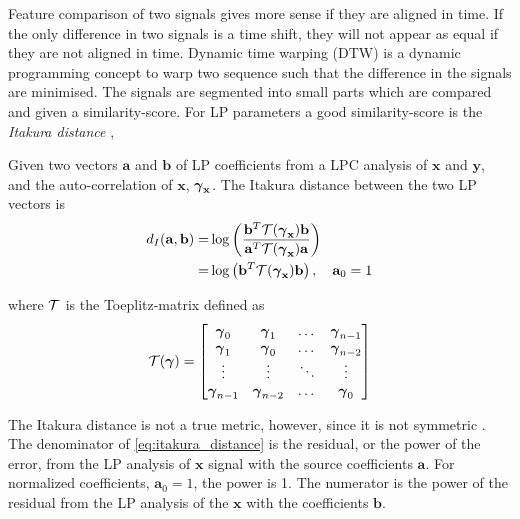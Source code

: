 Feature comparison of two signals gives more sense if they are aligned in time. If the only difference in two signals is a time shift, they will not appear as equal if they are not aligned in time. Dynamic time warping (DTW) is a dynamic programming concept to warp two sequence such that the difference in the signals are minimised. The signals are segmented into small parts which are compared and given a similarity-score. For LP parameters a good similarity-score is the \emph{Itakura distance} \cite{itakura90},
\newcommand{\ita}{d_{I}}
\begin{definition}
	Given two vectors $\mathbf{a}$ and $\mathbf{b}$ of LP coefficients from a LPC analysis of $\mathbf{x}$ and $\mathbf{y}$, and the auto-correlation of $\mathbf{x}$, $\boldsymbol \gamma_\mathbf{x}$. The Itakura distance between the two LP vectors is
	\begin{equation}
		\label{eq:itakura_distance}
		\begin{split}
			\ita(\mathbf{a},\mathbf{b}) = & \log\pbrackets{\frac{\mathbf{b}^T \ttt(\auto_{\mathbf{x}}) \mathbf{b}}{\mathbf{a}^T \ttt(\auto_{\mathbf{x}}) \mathbf{a}}} \\
			 = & \log\pbrackets{\mathbf{b}^T \ttt(\auto_{\mathbf{x}}) \mathbf{b}}, \quad \mathbf{a}_0 = 1
		\end{split}
	\end{equation}
\end{definition}
where $\mathcal T$ is the Toeplitz-matrix defined as 
\begin{equation}
	\label{eq:toeplitz}
	\mathcal T(\boldsymbol \gamma) = 
	\begin{bmatrix}
		\boldsymbol \gamma_0 & \boldsymbol \gamma_1 & \dots & \boldsymbol \gamma_{n-1} 	\\
		\boldsymbol \gamma_1 & \boldsymbol \gamma_0 & \dots & \boldsymbol \gamma_{n-2} \\
		\vdots & \vdots & \ddots & \vdots \\
		\boldsymbol \gamma_{n-1} & \boldsymbol \gamma_{n-2} & \dots & \boldsymbol \gamma_{0}
	\end{bmatrix}
\end{equation}	

The Itakura distance is not a true metric, however, since it is not symmetric \cite{kreyszig78}. The denominator of \eqref{eq:itakura_distance} is the residual, or the power of the error, from the LP analysis of $\mathbf{x}$ signal with the source coefficients $\mathbf{a}$. For normalized coefficients, $\mathbf{a}_0 = 1$, the power is 1. The numerator is the power of the residual from the LP analysis of the $\mathbf{x}$ with the coefficients $\mathbf{b}$. 

